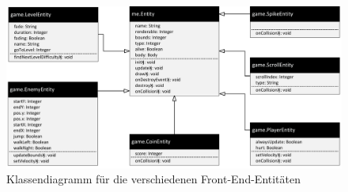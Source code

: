 \newpage
\begin{figure}[ht]
\centering
\includegraphics[width=1.0\textwidth]{figures/KlassendiagrammFrontEndEntities.pdf}
\caption{Klassendiagramm für die verschiedenen Front-End-Entitäten}
\label{MEentity}
\end{figure}   

\newpage    



  
 

 
  
